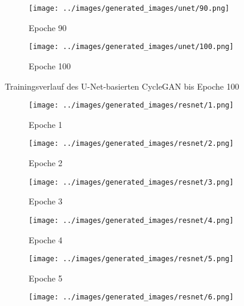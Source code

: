 \begin{figure}[H]
\hspace{1em}%
\begin{subfigure}[b]{0.1\textwidth}
 \centering
 \texttt{[image: ../images/generated\_images/unet/90.png]}
 \caption{Epoche 90}
\end{subfigure}
\hspace{1em}%
\begin{subfigure}[b]{0.1\textwidth}
\centering
\texttt{[image: ../images/generated\_images/unet/100.png]}
\caption{Epoche 100}
\end{subfigure}
     \caption{Trainingsverlauf des U-Net-basierten \ac{CycleGAN} bis Epoche 100}
     \label{fig:unet-generated-imgs}
\end{figure}

\begin{figure}[H]
  \centering
 \captionsetup[subfigure]{labelformat=empty}
  \begin{subfigure}[b]{0.1\textwidth}
      \centering
      \texttt{[image: ../images/generated\_images/resnet/1.png]}
      \caption{Epoche 1}
  \end{subfigure}
  \hspace{1em}%
  \begin{subfigure}[b]{0.1\textwidth}
      \centering
      \texttt{[image: ../images/generated\_images/resnet/2.png]}
      \caption{Epoche 2}
  \end{subfigure}
  \hspace{1em}%
  \begin{subfigure}[b]{0.1\textwidth}
      \centering
      \texttt{[image: ../images/generated\_images/resnet/3.png]}
      \caption{Epoche 3}
  \end{subfigure}
  \hspace{1em}%
  \begin{subfigure}[b]{0.1\textwidth}
   \centering
   \texttt{[image: ../images/generated\_images/resnet/4.png]}
   \caption{Epoche 4}
 \end{subfigure}
 \hspace{1em}%
 \begin{subfigure}[b]{0.1\textwidth}
   \centering
   \texttt{[image: ../images/generated\_images/resnet/5.png]}
   \caption{Epoche 5}
 \end{subfigure}
 \hspace{1em}%
 \begin{subfigure}[b]{0.1\textwidth}
   \centering
   \texttt{[image: ../images/generated\_images/resnet/6.png]}

\end{subfigure}
\end{figure}
